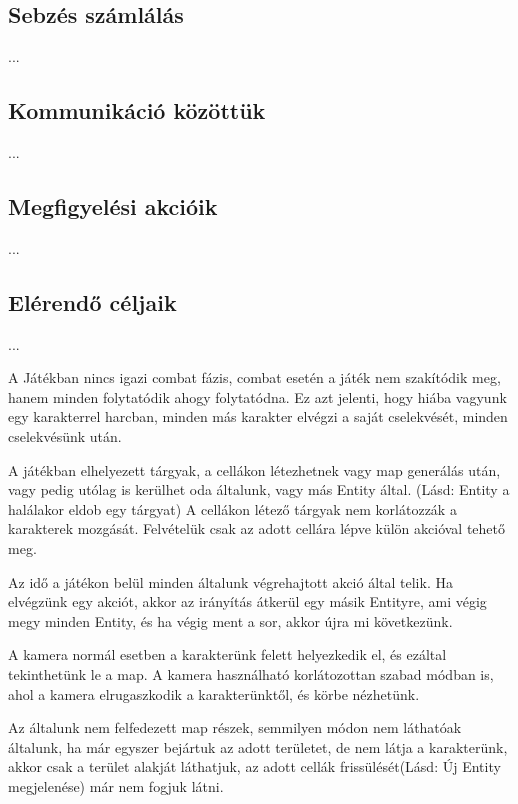 \subsection{Sebzés számlálás}

...

\subsection{Kommunikáció közöttük}

...

\subsection{Megfigyelési akcióik}

...

\subsection{Elérendő céljaik}

...


A Játékban nincs igazi combat fázis, combat esetén a játék nem szakítódik meg, hanem minden folytatódik ahogy folytatódna.
Ez azt jelenti, hogy hiába vagyunk egy karakterrel harcban, minden más karakter elvégzi a saját cselekvését, minden cselekvésünk után.



A játékban elhelyezett tárgyak, a cellákon létezhetnek vagy map generálás után,
vagy pedig utólag is kerülhet oda általunk, vagy más Entity által. (Lásd: Entity a halálakor eldob egy tárgyat)
A cellákon létező tárgyak nem korlátozzák a karakterek mozgását.
Felvételük csak az adott cellára lépve külön akcióval tehető meg.


Az idő a játékon belül minden általunk végrehajtott akció által telik.
Ha elvégzünk egy akciót, akkor az irányítás átkerül egy másik Entityre,
ami végig megy minden Entity, és ha végig ment a sor, akkor újra mi következünk.


A kamera normál esetben a karakterünk felett helyezkedik el, és ezáltal tekinthetünk le a map.
A kamera használható korlátozottan szabad módban is, ahol a kamera elrugaszkodik a karakterünktől, és körbe nézhetünk.


Az általunk nem felfedezett map részek, semmilyen módon nem láthatóak általunk, ha már egyszer bejártuk az adott területet, 
de nem látja a karakterünk, akkor csak a terület alakját láthatjuk, az adott cellák frissülését(Lásd: Új Entity megjelenése) már nem fogjuk látni.

